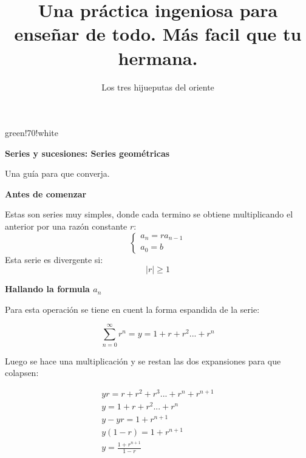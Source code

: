 \documentclass{article}
\title{Una práctica ingeniosa para enseñar de todo. Más facil que tu hermana.}
\author{Los tres hijueputas del oriente}
\newenvironment{formula-box}{
	\begin{tcolorbox}[
		colframe=black, %
		colback=white, %
		arc=1mm, %
		boxrule=1pt, %
		left=2mm, %
		right=2mm, %
		top=2mm, %
		bottom=2mm, %
		]
	}{
	\end{tcolorbox}
}
\newenvironment{title-box}[1]{
	\begin{tcolorbox}[
		colframe=white, %
		colback=white, %
		arc=1mm, %
		left=2mm, %
		right=2mm, %
		top=2mm, %
		bottom=2mm, %
		borderline={0.5mm}{0mm}{#1,dashed},
		enhanced,
		boxrule=0.5mm,
		]
	}{
	\end{tcolorbox}
}
\begin{document}
	
	
	\begin{multicols}{2}
		\begin{title-box}{green!70!white}
			{\raggedright \large \textbf{Series y sucesiones: Series geométricas} \par}
			
			\vspace{2mm}
			
			\begin{title-sign}\end{title-sign}
			
			\vspace{5mm}
			
			 Una guía para que converja. 
		\end{title-box}
		
		\vfill
		
		\begin{formula-box}
			{\raggedright \large \textbf{Antes de comenzar} \par}
			
			Estas son series muy simples, donde cada termino se obtiene multiplicando el anterior por una razón constante $r$:
			\[
			\begin{cases}
				a_n = ra_{n-1}\\
				a_0 = b
			\end{cases}
			\]
			Esta serie es divergente si:
			\[
			|r| \geq 1
			\]
		\end{formula-box}
		
		\begin{formula-box}
			{\raggedright \large \textbf{Hallando la formula $a_n$} \par}
			
			Para esta operación se tiene en cuent la forma espandida de la serie:
			
			\[
			\sum_{n=0}^{\infty}r^n = y = 1 + r + r^2 ... + r^n
			\]
			
			Luego se hace una multiplicación y se restan las dos expansiones para que colapsen:
			
			\[
			\begin{array}{c}
				yr = r + r^2 + r^3 ... + r^n + r^{n+1} \\
				y = 1 + r + r^2 ... + r^n \\
				y - yr = 1 + r^{n+1} \\
				y(1 - r) = 1 + r^{n+1} \\
				y = \frac{1 + r^{n+1}}{1-r}
			\end{array}
			\]
			

\end{formula-box}
\end{multicols}
\end{document}
